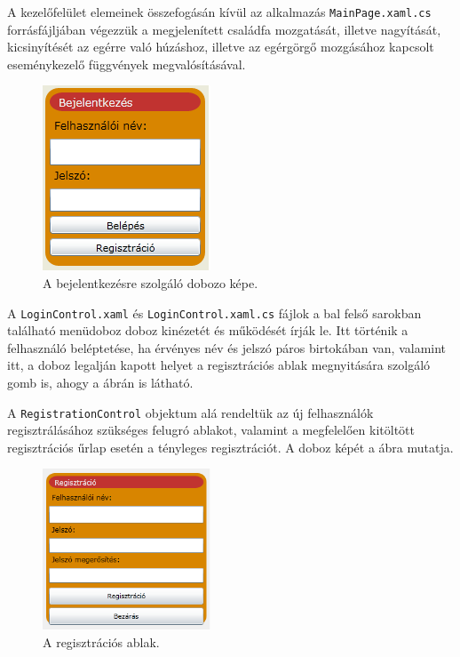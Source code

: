 A kezelőfelület elemeinek összefogásán kívül az alkalmazás \texttt{MainPage.xaml.cs} forrásfájljában végezzük a megjelenített családfa mozgatását, illetve nagyítását, kicsinyítését az egérre való húzáshoz, illetve az egérgörgő mozgásához kapcsolt eseménykezelő függvények megvalósításával.

\bigskip

\begin{figure}[!ht]
\centering
\includegraphics[width=50mm, keepaspectratio]{figures/login.png}
\caption{A bejelentkezésre szolgáló dobozo képe.}
\label{fig:alk_login}
\end{figure}

A \texttt{LoginControl.xaml} és \texttt{LoginControl.xaml.cs} fájlok a bal felső sarokban található menüdoboz doboz kinézetét és működését írják le. Itt történik a felhasználó beléptetése, ha érvényes név és jelszó páros birtokában van, valamint itt, a doboz legalján kapott helyet a regisztrációs ablak megnyitására szolgáló gomb is, ahogy a  ábrán is látható.

\bigskip

A \texttt{RegistrationControl} objektum alá rendeltük az új felhasználók regisztrálásához szükséges felugró ablakot, valamint a megfelelően kitöltött regisztrációs űrlap esetén a tényleges regisztrációt. A doboz képét a  ábra mutatja.

\begin{figure}[!ht]
\centering
\includegraphics[width=50mm, keepaspectratio]{figures/register.png}
\caption{A regisztrációs ablak.}
\label{fig:alk_register}
\end{figure}

